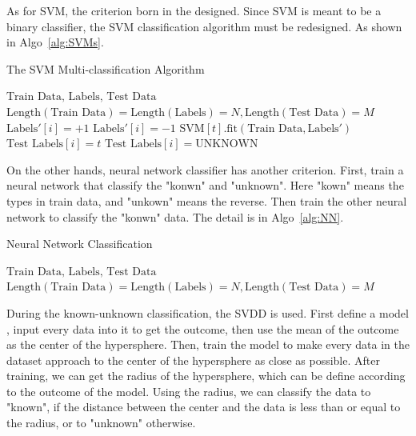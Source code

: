\documentclass[twocolumn,10pt]{article}
\begin{document}
  As for SVM, the criterion born in the designed. Since SVM is meant to be a binary classifier, the SVM classification 
  algorithm must be redesigned. As shown in Algo~\ref{alg:SVMs}. 
  \begin{algorithm}[h]
    \caption{The SVM Multi-classification Algorithm}\label{alg:SVMs}
    \begin{algorithmic}[1]
      \Require $\text{Train Data, Labels, Test Data}$
      \Assume $\text{Length}(\text{Train Data})=\text{Length}(\text{Labels})=N,\text{Length}(\text{Test Data})=M$
            \State $\text{Labels}'[i] = +1$
          \Else
            \State $\text{Labels}'[i] = -1$
          \EndIf
        \EndFor
        \State $\text{SVM}[t].\text{fit}(\text{Train Data}, \text{Labels}')$
      \EndFor
            \State $\text{Test Labels}[i] = t$
          \Else
            \State $\text{Test Labels}[i] = \text{UNKNOWN}$
          \EndIf
        \EndFor
      \EndFor
    \end{algorithmic}
  \end{algorithm}

  On the other hands, neural network classifier has another criterion. First, train a neural network that classify the 
  "konwn" and "unknown". Here "kown" means the types in train data, and "unkown" means the reverse. Then train the other 
  neural network to classify the "konwn" data. The detail is in Algo~\ref{alg:NN}.
  \begin{algorithm}[tb]
    \caption{Neural Network Classification}\label{alg:NN}
    \begin{algorithmic}[1]
      \Require $\text{Train Data, Labels, Test Data}$
      \Assume $\text{Length}(\text{Train Data})=\text{Length}(\text{Labels})=N,\text{Length}(\text{Test Data})=M$
    \end{algorithmic}
  \end{algorithm}
  During the known-unknown classification, the SVDD is used. First define a model , input every data into it to get the outcome, then use the mean of the outcome as the center of the hypersphere. Then, train the model to make every data in the dataset approach to the center of the hypersphere as close as possible. After training, we can get the radius of the hypersphere, which can be define according to the outcome of the model. Using the radius, we can classify the data to "known", if the distance between the center and the data is less than or equal to the radius, or to "unknown" otherwise.
\end{document}

